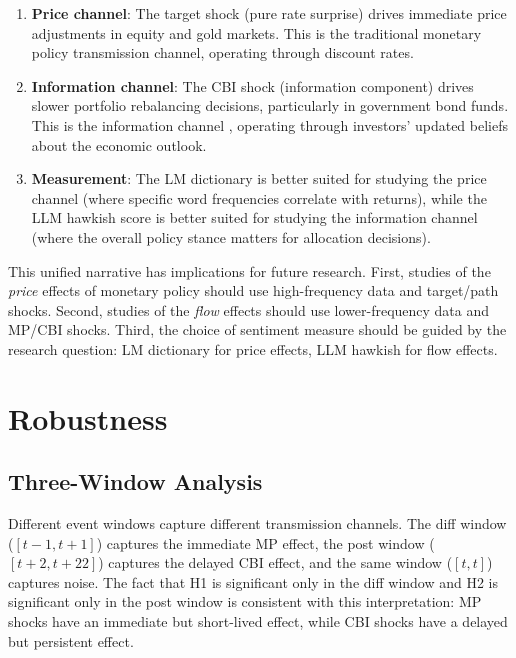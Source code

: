 \documentclass[11pt,a4paper]{article}
\begin{document}
\begin{enumerate}
    \item \textbf{Price channel}: The target shock (pure rate surprise) drives immediate price adjustments in equity and gold markets. This is the traditional monetary policy transmission channel, operating through discount rates.
    
    \item \textbf{Information channel}: The CBI shock (information component) drives slower portfolio rebalancing decisions, particularly in government bond funds. This is the information channel \citep{nakamura2018high, jarocinski2020deconstructing}, operating through investors' updated beliefs about the economic outlook.
    
    \item \textbf{Measurement}: The LM dictionary is better suited for studying the price channel (where specific word frequencies correlate with returns), while the LLM hawkish score is better suited for studying the information channel (where the overall policy stance matters for allocation decisions).
\end{enumerate}

This unified narrative has implications for future research. First, studies of the \textit{price} effects of monetary policy should use high-frequency data and target/path shocks. Second, studies of the \textit{flow} effects should use lower-frequency data and MP/CBI shocks. Third, the choice of sentiment measure should be guided by the research question: LM dictionary for price effects, LLM hawkish for flow effects.

\section{Robustness}
\label{sec:robust}

\subsection{Three-Window Analysis}

Different event windows capture different transmission channels. The diff window ($[t-1, t+1]$) captures the immediate MP effect, the post window ($[t+2, t+22]$) captures the delayed CBI effect, and the same window ($[t, t]$) captures noise. The fact that H1 is significant only in the diff window and H2 is significant only in the post window is consistent with this interpretation: MP shocks have an immediate but short-lived effect, while CBI shocks have a delayed but persistent effect.
\end{document}
